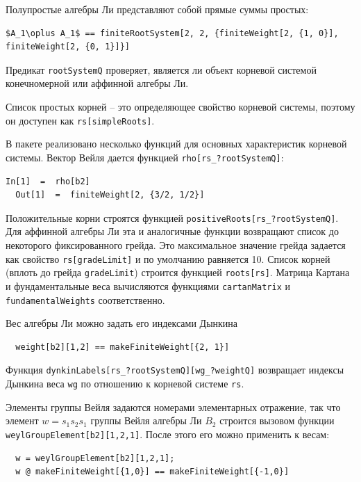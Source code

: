 Полупростые алгебры Ли представляют собой прямые суммы простых:
\begin{lstlisting}[mathescape=true]
  $A_1\oplus A_1$ == finiteRootSystem[2, 2, {finiteWeight[2, {1, 0}], finiteWeight[2, {0, 1}]}]
\end{lstlisting}

Предикат \lstinline{rootSystemQ} проверяет, является ли объект корневой системой конечномерной или аффинной алгебры Ли.

Список простых корней -- это определяющее свойство корневой системы, поэтому он доступен как \lstinline{rs[simpleRoots]}.

В пакете реализовано несколько функций для основных характеристик корневой системы. Вектор Вейля дается функцией
\lstinline{rho[rs_?rootSystemQ]}:
\begin{lstlisting}[label=list:1]
  In[1]  =  rho[b2]
  Out[1]  =  finiteWeight[2, {3/2, 1/2}]
\end{lstlisting}
Положительные корни строятся функцией  \lstinline{positiveRoots[rs_?rootSystemQ]}. Для аффинной алгебры Ли эта и аналогичные функции возвращают список до некоторого фиксированного грейда. Это максимальное значение грейда задается как свойство \lstinline{rs[gradeLimit]} и по умолчанию равняется 10. Список корней  (вплоть до грейда \lstinline{gradeLimit}) строится функцией \lstinline{roots[rs]}. Матрица Картана и фундаментальные веса вычисляются функциями \lstinline{cartanMatrix} и \lstinline{fundamentalWeights} соответственно.

Вес алгебры Ли можно задать его индексами Дынкина
\begin{lstlisting}
  weight[b2][1,2] == makeFiniteWeight[{2, 1}]
\end{lstlisting}
Функция \lstinline{dynkinLabels[rs_?rootSystemQ][wg_?weightQ]} возвращает индексы Дынкина веса \lstinline{wg} по отношению к корневой системе \lstinline{rs}.

Элементы группы Вейля задаются номерами элементарных отражение, так что элемент  $w=s_{1}s_{2}s_{1}$ группы Вейля алгебры Ли $B_{2}$ строится вызовом функции \lstinline{weylGroupElement[b2][1,2,1]}. После этого его можно применить к весам:
\begin{lstlisting}
  w = weylGroupElement[b2][1,2,1];
  w @ makeFiniteWeight[{1,0}] == makeFiniteWeight[{-1,0}]
\end{lstlisting}

